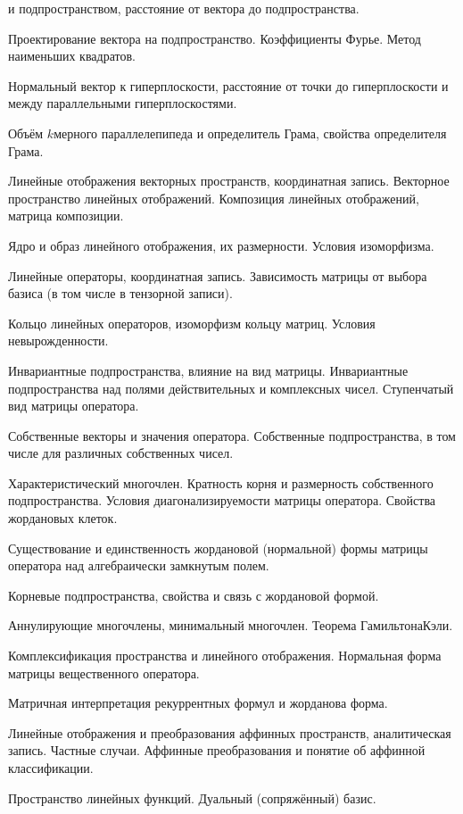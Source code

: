 \documentclass[a4paper]{article}
\begin{document}
\begin{nums}{-2}
и подпространством, расстояние от вектора до подпространства.
\item Проектирование вектора на подпространство. Коэффициенты Фурье. Метод наименьших квадратов.
\item Нормальный вектор к гиперплоскости, расстояние от точки до гиперплоскости и
между параллельными гиперплоскостями.
\item Объём $k$\д мерного параллелепипеда и определитель Грама, свойства определителя Грама.
\item Линейные отображения векторных пространств, координатная запись. Векторное пространство линейных отображений.
Композиция линейных отображений, матрица композиции.
\item Ядро и образ линейного отображения, их размерности. Условия изоморфизма.
\item Линейные операторы, координатная запись. Зависимость матрицы от выбора базиса
(в том числе в тензорной записи).
\item Кольцо линейных операторов, изоморфизм кольцу матриц. Условия невырожденности.
\item Инвариантные подпространства, влияние на вид матрицы. Инвариантные подпространства над полями действительных и
комплексных чисел. Ступенчатый вид матрицы оператора.
\item Собственные векторы и значения оператора. Собственные подпространства, в том числе для различных
собственных чисел.
\item Характеристический многочлен. Кратность корня и размерность собственного подпространства.
Условия диагонализируемости матрицы оператора. Свойства жордановых клеток.
\item Существование и единственность жордановой (нормальной) формы матрицы
оператора над алгебраически замкнутым полем.
\item Корневые подпространства, свойства и связь с жордановой формой.
\item Аннулирующие многочлены, минимальный многочлен. Теорема Гамильтона\ч Кэли.
\item Комплексификация пространства и линейного отображения. Нормальная форма матрицы
вещественного оператора.
\item Матричная интерпретация рекуррентных формул и жорданова форма.
\item Линейные отображения и преобразования аффинных пространств, аналитическая запись.
Частные случаи. Аффинные преобразования и понятие об аффинной классификации.
\item Пространство линейных функций. Дуальный (сопряжённый) базис.

\end{nums}
\end{document}
